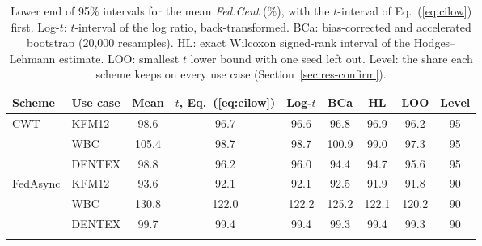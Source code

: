 \documentclass[pdflatex,sn-mathphys-num]{sn-jnl}
\newcommand{\fedcent}{\textit{Fed:Cent}}
\begin{document}
\begin{appendices}
\begin{table}[h]
\caption{Lower end of 95\% intervals for the mean \fedcent{} (\%), with the $t$-interval of Eq.~(\ref{eq:cilow}) first. Log-$t$: $t$-interval of the log ratio, back-transformed. BCa: bias-corrected and accelerated bootstrap (20,000 resamples). HL: exact Wilcoxon signed-rank interval of the Hodges--Lehmann estimate. LOO: smallest $t$ lower bound with one seed left out. Level: the share each scheme keeps on every use case (Section~\ref{sec:res-confirm}).}\label{tab:sensitivity}
\footnotesize
\begin{tabular*}{\textwidth}{@{\extracolsep\fill}llccccccc}
\toprule
Scheme & Use case & Mean & $t$, Eq.~(\ref{eq:cilow}) & Log-$t$ & BCa & HL & LOO & Level \\
\midrule
CWT & KFM12 & 98.6 & 96.7 & 96.6 & 96.8 & 96.9 & 96.2 & 95 \\
 & WBC & 105.4 & 98.7 & 98.7 & 100.9 & 99.0 & 97.3 & 95 \\
 & DENTEX & 98.8 & 96.2 & 96.0 & 94.4 & 94.7 & 95.6 & 95 \\
FedAsync & KFM12 & 93.6 & 92.1 & 92.1 & 92.5 & 91.9 & 91.8 & 90 \\
 & WBC & 130.8 & 122.0 & 122.2 & 125.2 & 122.1 & 120.2 & 90 \\
 & DENTEX & 99.7 & 99.4 & 99.4 & 99.3 & 99.4 & 99.3 & 90 \\
\botrule
\end{tabular*}
\end{table}

\FloatBarrier
\end{appendices}


\end{document}

